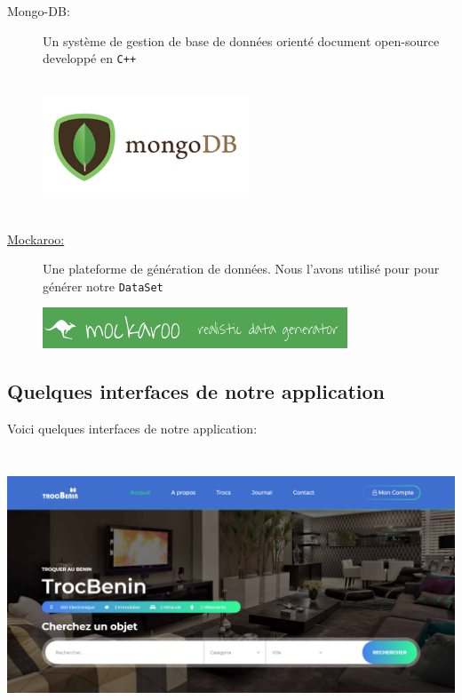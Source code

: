 \documentclass[12pt]{report}
\begin{document}
\begin{description}
		\item[\sc Mongo-DB:] Un système de gestion de base de données orienté document open-source developpé en {\tt C++}
			\begin{center}
				\includegraphics[scale=1, width=0.5\textwidth, height=4cm]{mongo}
				\label{mongo}
			\end{center}
		
		\item [\sc \href{https://www.mockaroo.com/}{\color{blue} Mockaroo:}  ] Une plateforme de génération de données. Nous l'avons utilisé pour pour générer notre {\tt DataSet}  
		
		\begin{center}
			\includegraphics[scale=1]{mock}
			\label{mock}
		\end{center}
	\end{description}
	
	\subsection{\sc Quelques interfaces de notre application}
	
	Voici quelques interfaces de notre application:
	\begin{center}
		\includegraphics[scale=0.5, height=8cm]{inter1}
	\end{center}
	
\end{document}
